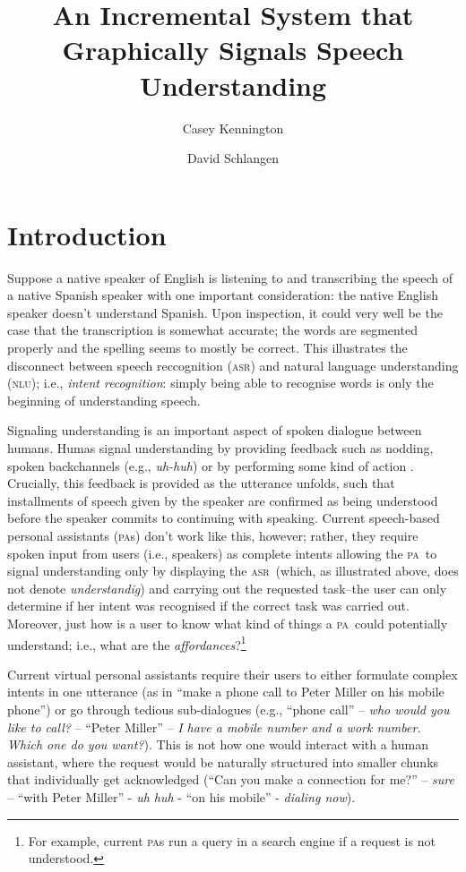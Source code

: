 \documentclass[11pt]{article}
\title{An Incremental System that Graphically Signals Speech Understanding}
\author{Casey Kennington \and David Schlangen}
\newcommand{\nlu}[0]{\textsc{nlu}}
\newcommand{\asr}[0]{\textsc{asr}}
\newcommand{\pa}[0]{\textsc{pa}}
\begin{document}

\maketitle

\begin{abstract}

\end{abstract}

\section{Introduction}
\label{section:intro}

Suppose a native speaker of English is listening to and transcribing the speech of a native Spanish speaker with one important consideration: the native English speaker doesn't understand Spanish. Upon inspection, it could very well be the case that the transcription is somewhat accurate; the words are segmented properly and the spelling seems to mostly be correct. This illustrates the disconnect between speech reccognition (\asr) and natural language understanding (\nlu); i.e., \emph{intent recognition}: simply being able to recognise words is only the beginning of understanding speech. 

Signaling understanding is an important aspect of spoken dialogue between humans. Humas signal understanding by providing feedback such as nodding, spoken backchannels (e.g., \emph{uh-huh}) or by performing some kind of action \cite{Clark1996}. Crucially, this feedback is provided as the utterance unfolds, such that installments of speech given by the speaker are confirmed as being understood before the speaker commits to continuing with speaking. Current speech-based personal assistants (\pa s) don't work like this, however; rather, they require spoken input from users (i.e., speakers) as complete intents allowing the \pa\ to signal understanding only by displaying the \asr\ (which, as illustrated above, does not denote \emph{understandig}) and carrying out the requested task--the user can only determine if her intent was recognised if the correct task was carried out. Moreover, just how is a user to know what kind of things a \pa\ could potentially understand; i.e., what are the \emph{affordances}?\footnote{For example, current \pa s run a query in a search engine if a request is not understood.}

Current virtual personal assistants require their users to either formulate complex intents in one utterance (as in ``make a phone call to Peter Miller on his mobile phone'') or go through tedious sub-dialogues (e.g., ``phone call'' -- \emph{who would you like to call?} -- ``Peter Miller'' -- \emph{I have a mobile number and a work number. Which one do you want?}). This is not how one would interact with a human assistant, where the request would be naturally structured into smaller chunks that individually get acknowledged (``Can you make a connection for me?'' -- \emph{sure} -- ``with Peter Miller'' - \emph{uh huh} - ``on his mobile'' - \emph{dialing now}). 
\end{document}
